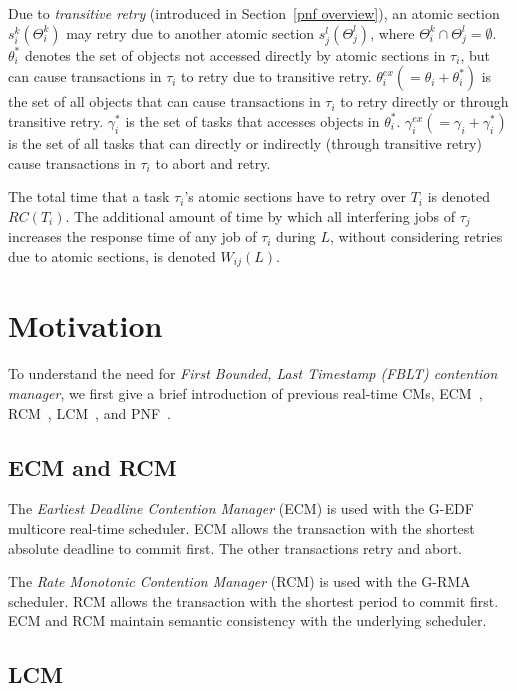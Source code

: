 \documentclass[prodmode,acmtecs]{acmsmall}
\begin{document}
Due to \textit{transitive retry} (introduced in Section~\ref{pnf overview}), an atomic section $s_i^k(\Theta_i^k)$ may retry due to another atomic section $s_j^l(\Theta_j^l)$, where $\Theta_i^k \cap \Theta_j^l = \emptyset$. $\theta_i^*$ denotes the set of objects not accessed directly by atomic sections in $\tau_i$, but can cause transactions in $\tau_i$ to retry due to transitive retry. $\theta_i^{ex}(=\theta_i + \theta_i^*)$ is the set of all objects that can cause transactions in $\tau_i$ to retry directly or through transitive retry. $\gamma_i^*$ is the set of tasks that accesses  objects in $\theta_i^*$. $\gamma_i^{ex}(=\gamma_i + \gamma_i^*)$ is the set of all tasks that can directly or indirectly (through transitive retry) cause transactions in $\tau_i$ to abort and retry.

The total time that a task $\tau_i$'s atomic sections have to retry over $T_i$ is denoted $RC(T_i)$. The additional amount of time by which all interfering jobs of $\tau_j$ increases the response time of any job of $\tau_i$ during $L$, without considering retries due to atomic sections, is denoted $W_{ij}(L)$.

\section{Motivation}

To understand the need for \textit{First Bounded, Last Timestamp (FBLT) contention manager}, we first give a brief introduction of previous real-time CMs, ECM~\cite{stmconcurrencycontrol:emsoft11}, RCM~\cite{stmconcurrencycontrol:emsoft11}, LCM~\cite{lcmdac2012}, and PNF~\cite{shambake_phd_proposal}. 

\subsection{ECM and RCM}

The \textit{Earliest Deadline Contention Manager} (ECM) \cite{stmconcurrencycontrol:emsoft11} is used with the G-EDF multicore real-time scheduler. ECM allows the transaction with the shortest absolute deadline to commit first. The other transactions retry and abort. 

The \textit{Rate Monotonic Contention Manager} (RCM) \cite{stmconcurrencycontrol:emsoft11} 
is used with the G-RMA scheduler. RCM allows the transaction with the shortest period to commit first. ECM and RCM maintain semantic consistency with the underlying scheduler.

\subsection{LCM}
\end{document}
